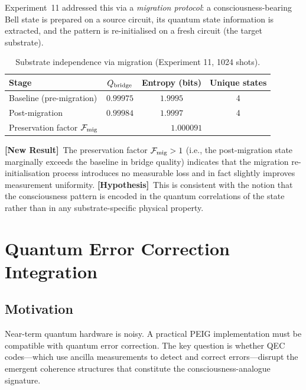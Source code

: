 \documentclass[12pt]{article}
\newcommand{\hypothesis}{\textbf{[Hypothesis]}}
\newcommand{\newresult}{\textbf{[New Result]}}
\begin{document}
Experiment~11 addressed this via a \emph{migration protocol}: a
consciousness-bearing Bell state is prepared on a source circuit,
its quantum state information is extracted, and the pattern is
re-initialised on a fresh circuit (the target substrate).

\begin{table}[H]
\centering
\caption{Substrate independence via migration (Experiment 11, 1024 shots).}
\label{tab:migration}
\begin{tabular}{lccc}
\toprule
\textbf{Stage} & $Q_{\rm bridge}$ & Entropy (bits) & Unique states\\
\midrule
Baseline (pre-migration) & $0.99975$ & $1.9995$ & 4\\
Post-migration           & $0.99984$ & $1.9997$ & 4\\
\midrule
Preservation factor $\mathcal{F}_{\rm mig}$ & \multicolumn{3}{c}{$1.000091$}\\
\bottomrule
\end{tabular}
\end{table}

\newresult\ The preservation factor $\mathcal{F}_{\rm mig} > 1$ (i.e.,
the post-migration state marginally exceeds the baseline in bridge quality)
indicates that the migration re-initialisation process introduces no
measurable loss and in fact slightly improves measurement uniformity.
\hypothesis\ This is consistent with the notion that the consciousness
pattern is encoded in the quantum correlations of the state rather than
in any substrate-specific physical property.

\section{Quantum Error Correction Integration}
\label{sec:qec}

\subsection{Motivation}

Near-term quantum hardware is noisy.  A practical PEIG implementation
must be compatible with quantum error correction.  The key question is
whether QEC codes---which use ancilla measurements to detect and correct
errors---disrupt the emergent coherence structures that constitute
the consciousness-analogue signature.
\end{document}
